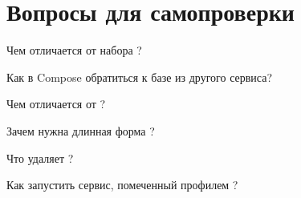 \section*{Вопросы для самопроверки}
\begin{selfcheck}
  \item Чем  отличается от набора ?
  \item Как в Compose обратиться к базе из другого сервиса?
  \item Чем  отличается от ?
  \item Зачем нужна длинная форма ?
  \item Что удаляет ?
  \item Как запустить сервис, помеченный профилем ?
\end{selfcheck}
